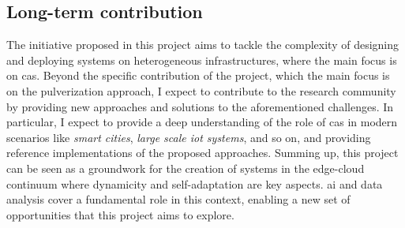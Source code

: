 \documentclass[12pt,a4paper]{article}
\begin{document}
\subsection{Long-term contribution}
The initiative proposed in this project aims to tackle the complexity of designing and deploying systems on heterogeneous infrastructures,
where the main focus is on \ac{cas}.
%
Beyond the specific contribution of the project,
which the main focus is on the pulverization approach,
I expect to contribute to the research community by providing new approaches and solutions to the aforementioned challenges.
%
In particular,
I expect to provide a deep understanding of the role of \ac{cas} in modern scenarios like \emph{smart cities}, \emph{large scale \ac{iot} systems}, and so on,
and providing reference implementations of the proposed approaches.
%
Summing up,
this project can be seen as a groundwork for the creation of systems in the edge-cloud continuum where dynamicity and self-adaptation are key aspects.
%
\ac{ai} and data analysis cover a fundamental role in this context,
enabling a new set of opportunities that this project aims to explore.

\newpage

\printbibliography
\end{document}

